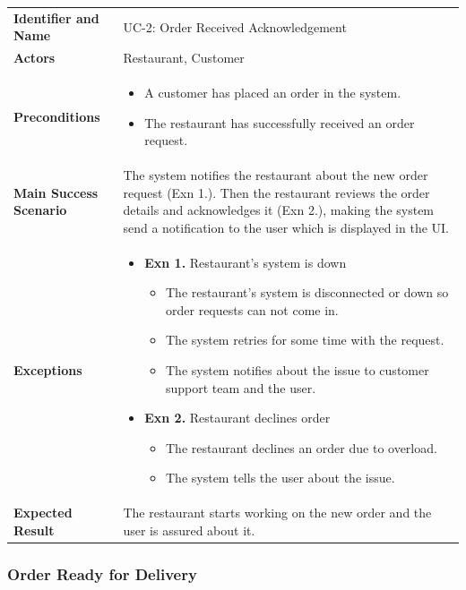 \noindent
\begin{tabularx}{\textwidth}{l X}
    \textbf{Identifier and Name} & UC-2: Order Received Acknowledgement \\
    \textbf{Actors} & Restaurant, Customer \\
    \textbf{Preconditions} & 
    \begin{itemize} 
        \item A customer has placed an order in the system.  
        \item The restaurant has successfully received an order request.
    \end{itemize} \\
    \textbf{Main Success Scenario} & The system notifies the restaurant about the new order request (Exn 1.). Then the restaurant reviews the order details  and acknowledges it (Exn 2.), making the system send a notification to the user which is displayed in the UI. \\
    \textbf{Exceptions} & \begin{itemize} 
        \item \textbf{Exn 1.} Restaurant's system is down
         \begin{itemize} 
            \item The restaurant's system is disconnected or down so order requests can not come in.
            \item The system retries for some time with the request.
            \item The system notifies about the issue to customer support team and the user.
         \end{itemize}
         \item \textbf{Exn 2.} Restaurant declines order
         \begin{itemize} 
            \item The restaurant declines an order due to overload.
            \item The system tells the user about the issue.
         \end{itemize}
    \end{itemize} \\
    \textbf{Expected Result} & The restaurant starts working on the new order and the user is assured about it.
\end{tabularx}

\subsubsection{Order Ready for Delivery}


